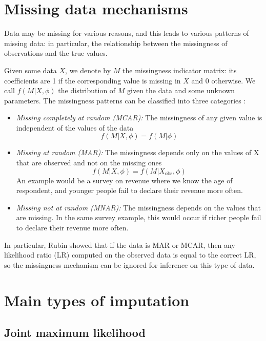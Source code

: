 	\section{Missing data mechanisms}
	Data may be missing for various reasons, and this leads to various patterns of missing data: in particular, the relationship between the missingness of observations and the true values. 
	
	Given some data $X$, we denote by $M$ the missingness indicator matrix: its coefficients are 1 if the corresponding value is missing in $X$ and 0 otherwise. We call $f(M \vert X, \phi)$ the distribution of $M$ given the data and some unknown parameters. The missingness patterns can be classified into three categories \cite[Ch.\ 1]{Rubin_missdata}:
	
\begin{itemize}
	\item \emph{Missing completely at random (MCAR):} The missingness of any given value is independent of the values of the data
	$$ f(M \vert X, \phi) = f(M \vert \phi)$$
	\item \emph{Missing at random (MAR):} The missingness depends only on the values of X that are observed and not on the missing ones
	$$f(M \vert X, \phi) = f(M \vert X_{\text{obs}}, \phi)$$
	An example would be a survey on revenue where we know the age of respondent, and younger people fail to declare their revenue more often.
	\item \emph{Missing not at random (MNAR):} The missingness depends on the values that are missing. In the same survey example, this would occur if richer people fail to declare their revenue more often.
\end{itemize}

In particular, Rubin showed \cite{rubin1976ignorable} that if the data is MAR or MCAR, then any likelihood ratio (LR) computed on the observed data is equal to the correct LR, so the missingness mechanism can be ignored for inference on this type of data.

	\section{Main types of imputation}
		\subsection{Joint maximum likelihood}
